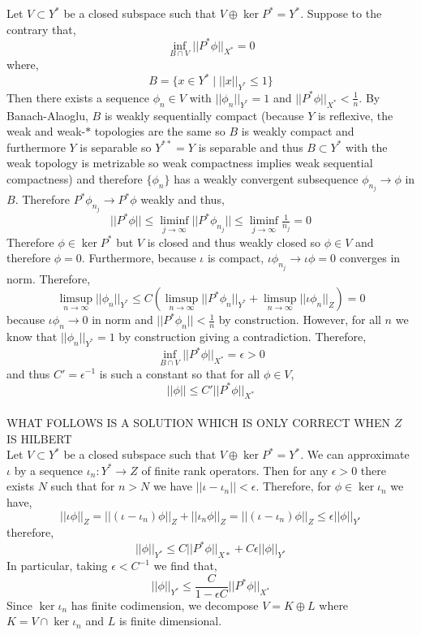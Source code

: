 \documentclass[12pt]{article}
\begin{document}
Let $V \subset Y^*$ be a closed subspace such that $V \oplus \ker{P^*} = Y^*$. Suppose to the contrary that,
\[ \inf_{B \cap V} || P^* \phi ||_{X^*} = 0 \]
where,
\[ B = \{ x \in Y^* \mid || x ||_{Y^*} \le 1 \} \]
Then there exists a sequence $\phi_n \in V$ with $|| \phi_n ||_{Y^*} = 1$ and $|| P^* \phi ||_{X^*} < \frac{1}{n}$. By Banach-Alaoglu, $B$ is weakly sequentially compact (because $Y$ is reflexive, the weak and weak-$*$ topologies are the same so $B$ is weakly compact and furthermore $Y$ is separable so $Y^{**} = Y$ is separable and thus $B \subset Y^*$ with the weak topology is metrizable so weak compactness implies weak sequential compactness) and therefore $\{ \phi_n \}$ has a weakly convergent subsequence $\phi_{n_j} \to \phi$ in $B$. Therefore $P^* \phi_{n_j} \to P^* \phi$ weakly and thus,
\[ || P^* \phi || \le \liminf_{j \to \infty} || P^* \phi_{n_j} || \le \liminf_{j \to \infty} \tfrac{1}{n_j} = 0 \]
Therefore $\phi \in \ker{P^*}$ but $V$ is closed and thus weakly closed so $\phi \in V$ and therefore $\phi = 0$. Furthermore, because $\iota$ is compact, $\iota \phi_{n_j} \to \iota \phi = 0$ converges in norm. Therefore,
\[ \limsup_{n \to \infty} || \phi_n ||_{Y^*} \le C \left( \limsup_{n \to \infty}  || P^* \phi_n ||_{Y^*} + \limsup_{n \to \infty} || \iota \phi_n ||_Z \right) = 0 \]
because $\iota \phi_n \to 0$ in norm and $|| P^* \phi_n || < \frac{1}{n}$ by construction. However, for all $n$ we know that $|| \phi_n ||_{Y^*} = 1$ by construction giving a contradiction. Therefore, 
\[ \inf_{B \cap V} || P^* \phi ||_{X^*} = \epsilon > 0 \]
and thus $C' = \epsilon^{-1}$ is such a constant so that for all $\phi \in V$,
\[ || \phi || \le C' || P^* \phi ||_{X^*} \]
\bigskip\\
WHAT FOLLOWS IS A SOLUTION WHICH IS ONLY CORRECT WHEN $Z$ IS HILBERT
\bigskip\\
Let $V \subset Y^*$ be a closed subspace such that $V \oplus \ker{P^*} = Y^{*}$. We can approximate $\iota$ by a sequence $\iota_n : Y^* \to Z$ of finite rank operators. Then for any $\epsilon > 0$ there exists $N$ such that for $n > N$ we have $|| \iota - \iota_n || < \epsilon$. Therefore, for $\phi \in \ker{\iota_n}$ we have,
\[ || \iota \phi ||_Z = || (\iota - \iota_n) \phi ||_Z + || \iota_n \phi ||_Z = || (\iota - \iota_n) \phi ||_Z \le \epsilon || \phi ||_{Y^*} \]
therefore,
\[ || \phi ||_{Y^*} \le C || P^* \phi ||_{X*} + C \epsilon || \phi ||_{Y^*} \]
In particular, taking $\epsilon < C^{-1}$ we find that,
\[ || \phi ||_{Y^*} \le \frac{C}{1 - \epsilon C} || P^* \phi ||_{X^*} \]
Since $\ker{\iota_n}$ has finite codimension, we decompose $V = K \oplus L$ where $K = V \cap \ker{\iota_n}$ and $L$ is finite dimensional.
\end{document}
